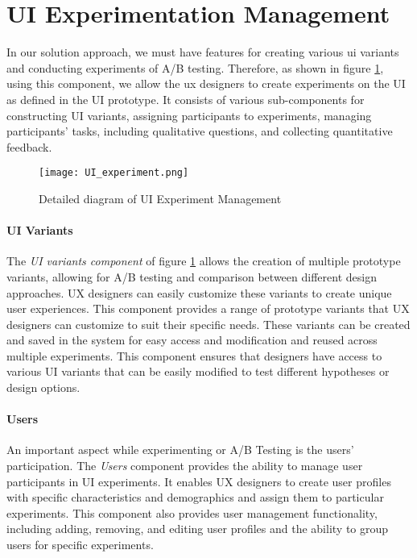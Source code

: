 \clearpage
\section{UI Experimentation Management}
\label{sc:section:experimentation}
In our solution approach, we must have features for creating various \ac{ui} variants and conducting experiments of A/B testing. 
Therefore, as shown in figure \ref{fig:sc:experiments}, using this component, we allow the \ac{ux} designers to create experiments on the UI as defined in the UI prototype.
It consists of various sub-components for constructing UI variants, assigning participants to experiments, managing participants' tasks, including qualitative questions, and collecting quantitative feedback.

\begin{figure}[htbp!]
    \centering    
    \texttt{[image: UI\_experiment.png]} 
    \caption[Details of UI Experiment Management]{Detailed diagram of UI Experiment Management}
    \label{fig:sc:experiments}
\end{figure}

\paragraph{UI Variants}
The \textit{UI variants component} of figure \ref{fig:sc:experiments} allows the creation of multiple prototype variants, allowing for A/B testing and comparison between different design approaches. 
UX designers can easily customize these variants to create unique user experiences.
This component provides a range of prototype variants that UX designers can customize to suit their specific needs. 
These variants can be created and saved in the system for easy access and modification and reused across multiple experiments. 
This component ensures that designers have access to various UI variants that can be easily modified to test different hypotheses or design options.

\paragraph{Users}
An important aspect while experimenting or A/B Testing is the users' participation. 
The \textit{Users} component provides the ability to manage user participants in UI experiments. 
It enables UX designers to create user profiles with specific characteristics and demographics and assign them to particular experiments. 
This component also provides user management functionality, including adding, removing, and editing user profiles and the ability to group users for specific experiments.

